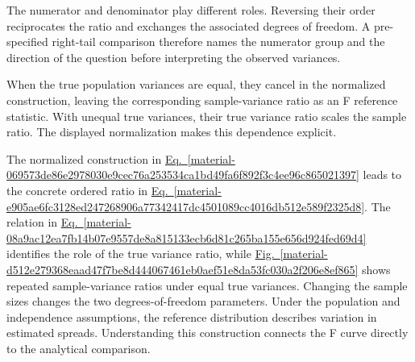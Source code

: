 \documentclass[11pt,a4paper]{article}
\begin{document}
\medskip

The numerator and denominator play different roles. Reversing their order reciprocates the ratio and exchanges the associated degrees of freedom. A pre-specified right-tail comparison therefore names the numerator group and the direction of the question before interpreting the observed variances.


When the true population variances are equal, they cancel in the normalized construction, leaving the corresponding sample-variance ratio as an F reference statistic. With unequal true variances, their true variance ratio scales the sample ratio. The displayed normalization makes this dependence explicit.


The normalized construction in \hyperref[material-069573de86e2978030e9cec76a253534ca1bd49fa6f892f3c4ee96c865021397]{Eq.~\ref*{material-069573de86e2978030e9cec76a253534ca1bd49fa6f892f3c4ee96c865021397}} leads to the concrete ordered ratio in \hyperref[material-e905ae6fc3128ed247268906a77342417dc4501089cc4016db512e589f2325d8]{Eq.~\ref*{material-e905ae6fc3128ed247268906a77342417dc4501089cc4016db512e589f2325d8}}. The relation in \hyperref[material-08a9ac12ea7fb14b07e9557de8a815133ecb6d81c265ba155e656d924fed69d4]{Eq.~\ref*{material-08a9ac12ea7fb14b07e9557de8a815133ecb6d81c265ba155e656d924fed69d4}} identifies the role of the true variance ratio, while \hyperref[material-d512e279368eaad47f7be8d444067461eb0aef51e8da53fc030a2f206e8ef865]{Fig.~\ref*{material-d512e279368eaad47f7be8d444067461eb0aef51e8da53fc030a2f206e8ef865}} shows repeated sample-variance ratios under equal true variances. Changing the sample sizes changes the two degrees-of-freedom parameters. Under the population and independence assumptions, the reference distribution describes variation in estimated spreads. Understanding this construction connects the F curve directly to the analytical comparison.
\end{document}
